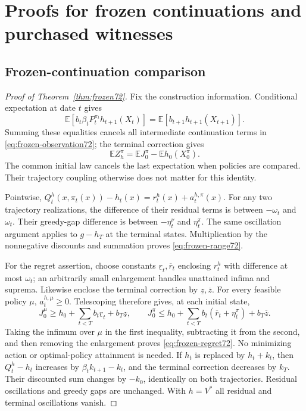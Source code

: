 \section{Proofs for frozen continuations and purchased witnesses}\label{supp:proofs72}
\subsection{Frozen-continuation comparison}\label{supp:frozen72}
\begin{proof}[Proof of Theorem~\ref{thm:frozen72}]
Fix the construction information. Conditional expectation at date $t$ gives
\[
 \mathbb E[b_t\beta_tP_t^{\pi_t}h_{t+1}(X_t)]
      =\mathbb E[b_{t+1}h_{t+1}(X_{t+1})].
\]
Summing these equalities cancels all intermediate continuation terms in \eqref{eq:frozen-observation72}; the terminal correction gives
\[
 \mathbb E Z_h^\pi=\mathbb E J_0^\pi-\mathbb E h_0(X_0^\pi).
\]
The common initial law cancels the last expectation when policies are compared. Their trajectory coupling otherwise does not matter for this identity.

Pointwise, $Q_t^h(x,\pi_t(x))-h_t(x)=r_t^h(x)+a_t^{h,\pi}(x)$. For any two trajectory realizations, the difference of their residual terms is between $-\omega_t$ and $\omega_t$. Their greedy-gap difference is between $-\eta_t^\nu$ and $\eta_t^\pi$. The same oscillation argument applies to $g-h_T$ at the terminal states. Multiplication by the nonnegative discounts and summation proves \eqref{eq:frozen-range72}.

For the regret assertion, choose constants $\underline r_t,\overline r_t$ enclosing $r_t^h$ with difference at most $\omega_t$; an arbitrarily small enlargement handles unattained infima and suprema. Likewise enclose the terminal correction by $\underline z,\overline z$. For every feasible policy $\mu$, $a_t^{h,\mu}\ge0$. Telescoping therefore gives, at each initial state,
\[
 J_0^\mu\ge h_0+\sum_{t<T}b_t\underline r_t+b_T\underline z,
 \qquad
 J_0^\pi\le h_0+\sum_{t<T}b_t(\overline r_t+\eta_t^\pi)
                         +b_T\overline z.
\]
Taking the infimum over $\mu$ in the first inequality, subtracting it from the second, and then removing the enlargement proves \eqref{eq:frozen-regret72}. No minimizing action or optimal-policy attainment is needed. If $h_t$ is replaced by $h_t+k_t$, then $Q_t^h-h_t$ increases by $\beta_tk_{t+1}-k_t$, and the terminal correction decreases by $k_T$. Their discounted sum changes by $-k_0$, identically on both trajectories. Residual oscillations and greedy gaps are unchanged. With $h=V^*$ all residual and terminal oscillations vanish.
\end{proof}

